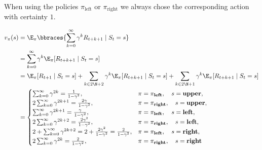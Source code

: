 \begin{solution}

When using the policies $\pi_\text{left}$ or $\pi_\text{right}$ we always chose the corresponding action with certainty $1$.

\begin{align*}
    v_\pi(s)
    & =
    \E_\pi
    \bbraces
    {
        \sum_{k=0}^\infty
            \gamma^k R_{t+k+1}
        \mid
        S_t = s
    } \\
    & =
    \sum_{k=0}^\infty
        \gamma^k
        \E_\pi[R_{t+k+1} \mid S_t = s] \\
    & =
    \E_\pi[R_{t+1} \mid S_t = s]
    +
    \sum_{k \in 2 \N + 2}
        \gamma^k
        \E_\pi[R_{t+k+1} \mid S_t = s]
    +
    \sum_{k \in 2 \N + 1}
        \gamma^k
        \E_\pi[R_{t+k+1} \mid S_t = s] \\
    & =
    \begin{cases}
        \sum_{k=0}^\infty \gamma^{2 k} = \frac{1}{1 - \gamma^2},
        & \pi = \pi_\textbf{left},  \quad s = \textbf{upper}, \\
        2 \sum_{k=0}^\infty \gamma^{2 k + 1} = \frac{2 \gamma}{1 - \gamma^2},
        & \pi = \pi_\textbf{right}, \quad s = \textbf{upper}, \\
        \sum_{k=0}^\infty \gamma^{2 k  + 1} = \frac{\gamma}{1 - \gamma^2},
        & \pi = \pi_\textbf{left},  \quad s = \textbf{left},  \\
        2 \sum_{k=0}^\infty \gamma^{2 k + 2} = \frac{2 \gamma^2}{1 - \gamma^2},
        & \pi = \pi_\textbf{right}, \quad s = \textbf{left},  \\
        2 + \sum_{k=0}^\infty \gamma^{2 k + 2} = 2 + \frac{2 \gamma^2}{1 - \gamma^2} = \frac{2}{1 - \gamma^2},
        & \pi = \pi_\textbf{left},  \quad s = \textbf{right}, \\
        2 \sum_{k=0}^\infty \gamma^{2 k} = \frac{2}{1 - \gamma^2},
        & \pi = \pi_\textbf{right}, \quad s = \textbf{right}
    \end{cases}
\end{align*}


\end{solution}

